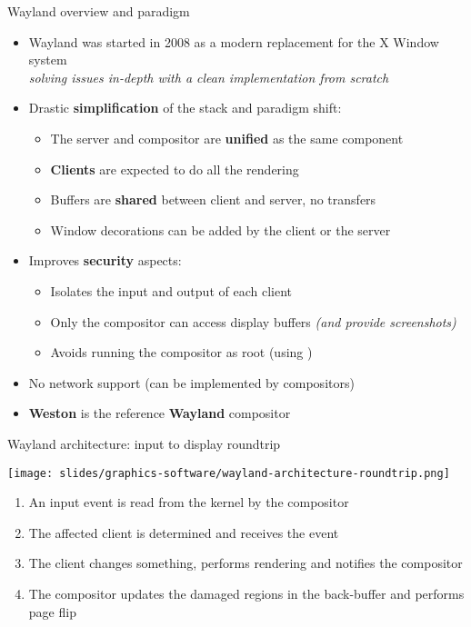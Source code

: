 \begin{frame}{Wayland overview and paradigm}
  \begin{itemize}
  \item Wayland was started in 2008 as a modern replacement for the X Window system\\
    \textit{solving issues in-depth with a clean implementation from scratch}
  \item Drastic \textbf{simplification} of the stack and paradigm shift:
    \begin{itemize}
    \item The server and compositor are \textbf{unified} as the same component
    \item \textbf{Clients} are expected to do all the rendering
    \item Buffers are \textbf{shared} between client and server, no transfers
    \item Window decorations can be added by the client or the server
    \end{itemize}
  \item Improves \textbf{security} aspects:
    \begin{itemize}
    \item Isolates the input and output of each client
    \item Only the compositor can access display buffers \textit{(and provide screenshots)}
    \item Avoids running the compositor as root (using )
    \end{itemize}
  \item No network support (can be implemented by compositors)
  \item \textbf{Weston} is the reference \textbf{Wayland} compositor
  \end{itemize}
\end{frame}

\begin{frame}{Wayland architecture: input to display roundtrip}
  \begin{minipage}{0.49\textwidth}
    \centering
    \texttt{[image: slides/graphics-software/wayland-architecture-roundtrip.png]}
  \end{minipage}
  \hfill
  \begin{minipage}{0.49\textwidth}
    \begin{enumerate}
    \item An input event is read from the kernel by the compositor
    \item The affected client is determined and receives the event
    \item The client changes something, performs rendering and notifies the compositor
    \item The compositor updates the damaged regions in the back-buffer and performs page flip
    \end{enumerate}
  \end{minipage}
\end{frame}

